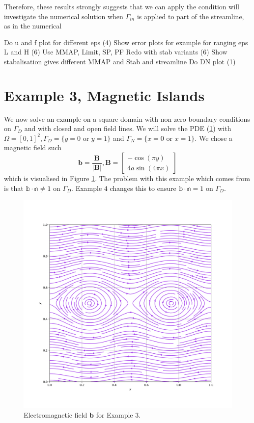 \documentclass[12pt,a4paper]{article}
\begin{document}
Therefore, these results strongly suggests that we can apply the condition  will investigate the numerical solution when $\Gamma_{in}$ is applied to part of the streamline, as in the numerical

Do u and f plot for different eps (4)
Show error plots for example for ranging eps  L and H (6)
Use MMAP, Limit, SP, PF
Redo with stab variants (6)
Show stabalisation gives different MMAP and Stab and streamline
Do DN plot (1)

\section{Example 3, Magnetic Islands}
We now solve an example on a square domain with non-zero boundary conditions on $\Gamma_D$ and with closed and open field lines.
We will solve the PDE (\ref{}) with $\Omega = [0,1]^2, \Gamma_D = \{y=0 \text{ or } y=1\}$ and $\Gamma_N = \{x=0 \text{ or } x=1\}$. We chose a magnetic field such 
\begin{equation}
\mathbf{b} = \frac{\mathbf{B}}{|\mathbf{B}|}, 
\mathbf{B} = \left[ \begin{matrix}
-\cos(\pi y)\\
4a \sin(4 \pi x)
\end{matrix} \right]
\end{equation}
which is visualised in Figure \ref{E3_VF}. The problem with this example which comes from \cite{} is that $\mathbb{b}\cdot \mathbb{n} \neq 1$ on $\Gamma_{D}$. Example $4$ changes this to ensure $\mathbb{b}\cdot \mathbb{n} = 1$ on $\Gamma_{D}$.
\begin{figure}[H]
 \includegraphics[width=\textwidth]{Pics/VectorField/E3b.png}
  \caption{Electromagnetic field $\mathbf{b}$ for Example $3$.}
 \label{E3_VF}
\end{figure}
\end{document}
